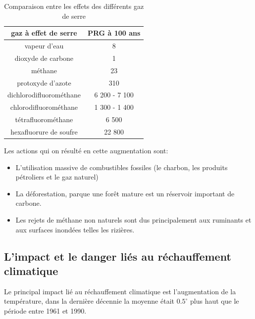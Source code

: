 \documentclass[a4paper,11pt]{article}
\begin{document}
\begin{table}[H]
  \caption{Comparaison entre les effets des différents gaz de serre}
  \begin{center}
    \begin{tabular}{ |c | c|}
      \hline
      gaz à effet de serre &  PRG à 100 ans \\
      \hline 
      \hline 
      vapeur d'eau &  8\\
      dioxyde de carbone  & 1\\
      méthane & 23\\
      protoxyde d'azote  &310\\
      dichlorodifluorométhane  & 6 200 - 7 100\\
      chlorodifluorométhane  & 1 300 - 1 400\\
      tétrafluorométhane &6 500\\
      hexafluorure de soufre & 22 800\\
      \hline
    \end{tabular}

  \end{center}
\end{table}

Les actions qui on résulté en cette augmentation sont:

\begin{itemize}

\item L'utilisation massive de combustibles fossiles (le charbon, les produits
  pétroliers et le gaz naturel)

\item La  déforestation, parque une forêt  mature est un  réservoir important de
  carbone.

\item  Les  rejets  de  méthane non naturels  sont  dus  principalement  aux
  ruminants et aux surfaces inondées telles les rizières.

\end{itemize}



\subsection{L’impact et le danger liés au réchauffement climatique}

Le principal  impact lié  au réchauffement climatique  est l'augmentation  de la
température, dans la dernière décennie  la moyenne était $0.5^{\circ}$ plus haut
que le période entre 1961 et 1990.
\end{document}
